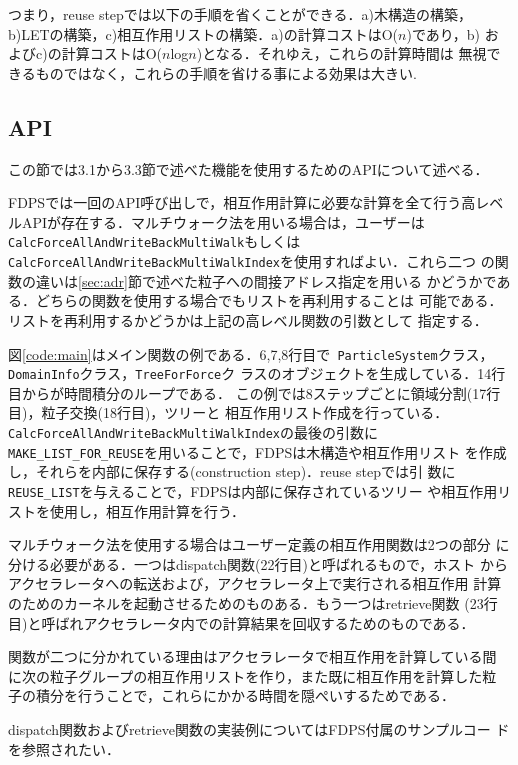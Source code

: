 \documentclass[submit]{ipsj}
\begin{document}
つまり，reuse stepでは以下の手順を省くことができる．a)木構造の構築，
b)LETの構築，c)相互作用リストの構築．a)の計算コストはO($n$)であり，b)
およびc)の計算コストはO($n$log$n$)となる．それゆえ，これらの計算時間は
無視できるものではなく，これらの手順を省ける事による効果は大きい.

\subsection{API}

この節では3.1から3.3節で述べた機能を使用するためのAPIについて述べる．

FDPSでは一回のAPI呼び出しで，相互作用計算に必要な計算を全て行う高レベ
ルAPIが存在する．マルチウォーク法を用いる場合は，ユーザーは{\tt
  CalcForceAllAndWriteBackMultiWalk}もしくは{\tt
  CalcForceAllAndWriteBackMultiWalkIndex}を使用すればよい．これら二つ
の関数の違いは\ref{sec:adr}節で述べた粒子への間接アドレス指定を用いる
かどうかである．どちらの関数を使用する場合でもリストを再利用することは
可能である．リストを再利用するかどうかは上記の高レベル関数の引数として
指定する．

図\ref{code:main}はメイン関数の例である．6,7,8行目で{\tt
  ParticleSystem}クラス，{\tt DomainInfo}クラス，{\tt TreeForForce}ク
ラスのオブジェクトを生成している．14行目からが時間積分のループである．
この例では8ステップごとに領域分割(17行目)，粒子交換(18行目)，ツリーと
相互作用リスト作成を行っている．{\tt
  CalcForceAllAndWriteBackMultiWalkIndex}の最後の引数に{\tt
  MAKE\_LIST\_FOR\_REUSE}を用いることで，FDPSは木構造や相互作用リスト
を作成し，それらを内部に保存する(construction step)．reuse stepでは引
数に{\tt REUSE\_LIST}を与えることで，FDPSは内部に保存されているツリー
や相互作用リストを使用し，相互作用計算を行う．

マルチウォーク法を使用する場合はユーザー定義の相互作用関数は2つの部分
に分ける必要がある．一つはdispatch関数(22行目)と呼ばれるもので，ホスト
からアクセラレータへの転送および，アクセラレータ上で実行される相互作用
計算のためのカーネルを起動させるためのものある．もう一つはretrieve関数
(23行目)と呼ばれアクセラレータ内での計算結果を回収するためのものである．

関数が二つに分かれている理由はアクセラレータで相互作用を計算している間
に次の粒子グループの相互作用リストを作り，また既に相互作用を計算した粒
子の積分を行うことで，これらにかかる時間を隠ぺいするためである．

dispatch関数およびretrieve関数の実装例についてはFDPS付属のサンプルコー
ドを参照されたい．
\end{document}
